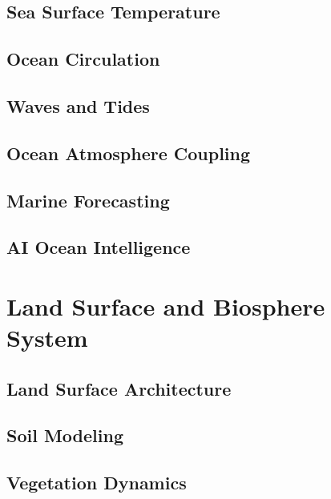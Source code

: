 \documentclass[11pt,a4paper,oneside]{report}
\begin{document}
\chapter{Sea Surface Temperature}



\chapter{Ocean Circulation}



\chapter{Waves and Tides}



\chapter{Ocean Atmosphere Coupling}



\chapter{Marine Forecasting}



\chapter{AI Ocean Intelligence}



\part{Land Surface and Biosphere System}


\chapter{Land Surface Architecture}



\chapter{Soil Modeling}



\chapter{Vegetation Dynamics}

\end{document}
